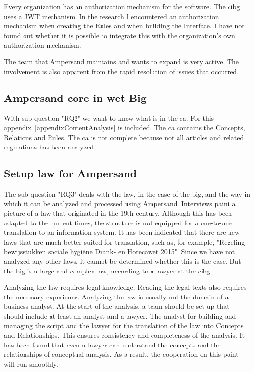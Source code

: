 Every organization has an authorization mechanism for the software.
The \acrshort{cibg} uses a JWT mechanism.
In the research I encountered an authorization mechanism when creating the Rules and when building the Interface.
I have not found out whether it is possible to integrate this with the organization's own authorization mechanism.


The team that Ampersand maintains and wants to expand is very active.
The involvement is also apparent from the rapid resolution of issues that occurred.


\subsection{Ampersand core in wet Big}\label{subsection:ampersand-core-in-wet-big}
With sub-question "\acrlong{RQ2}" we want to know what is in the \acrlong{ca}.
For this appendix~\ref{appendixContentAnalysis} is included.
The \acrlong{ca} contains the Concepts, Relations and Rules.
The \acrlong{ca} is not complete because not all articles and related regulations has been analyzed.


\subsection{Setup law for Ampersand}\label{subsection:setup-law-for-ampersand}
The sub-question "\acrlong{RQ3}" deals with the law, in the case of the \acrshort{big}, and the way in which it can be analyzed and processed using Ampersand.
Interviews paint a picture of a law that originated in the 19th century.
Although this has been adapted to the current times, the structure is not equipped for a one-to-one translation to an information system.
It has been indicated that there are new laws that are much better suited for translation, such as, for example, "Regeling bewijsstukken sociale hygiëne Drank- en Horecawet 2015".
Since we have not analyzed any other laws, it cannot be determined whether this is the case.
But the \acrshort{big} is a large and complex law, according to a lawyer at the \acrshort{cibg}.

Analyzing the law requires legal knowledge.
Reading the legal texts also requires the necessary experience.
Analyzing the law is usually not the domain of a business analyst.
At the start of the analysis, a team should be set up that should include at least an analyst and a lawyer.
The analyst for building and managing the script and the lawyer for the translation of the law into Concepts and Relationships.
This ensures consistency and completeness of the analysis.
It has been found that even a lawyer can understand the concepts and the relationships of conceptual analysis.
As a result, the cooperation on this point will run smoothly.

